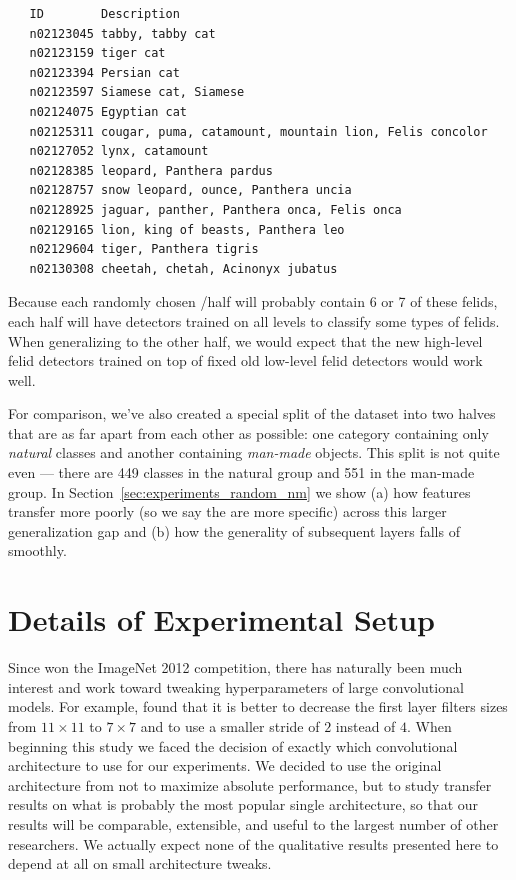 {
\small
\begin{verbatim}
   ID        Description
   n02123045 tabby, tabby cat
   n02123159 tiger cat
   n02123394 Persian cat
   n02123597 Siamese cat, Siamese
   n02124075 Egyptian cat
   n02125311 cougar, puma, catamount, mountain lion, Felis concolor
   n02127052 lynx, catamount
   n02128385 leopard, Panthera pardus
   n02128757 snow leopard, ounce, Panthera uncia
   n02128925 jaguar, panther, Panthera onca, Felis onca
   n02129165 lion, king of beasts, Panthera leo
   n02129604 tiger, Panthera tigris
   n02130308 cheetah, chetah, Acinonyx jubatus
\end{verbatim}
}

Because each randomly chosen \dA/\dB half will probably contain 6 or 7 of these felids, each half will have detectors trained on all levels to classify some types of felids. When generalizing to the other half, we would expect that the new high-level felid detectors trained on top of fixed old low-level felid detectors would work well.

For comparison, we've also created a special split of the dataset into two halves that are as far apart from each other as possible: one category containing only \emph{natural} classes and another containing \emph{man-made} objects. This split is not quite even --- there are 449 classes in the natural group and 551 in the man-made group. In Section~\ref{sec:experiments_random_nm} we show (a) how features transfer more poorly (so we say the are more specific) across this larger generalization gap and (b) how the generality of subsequent layers falls of smoothly.




\section{Details of Experimental Setup}

Since \cite{Krizhevsky-2012} won the ImageNet 2012 competition, there has naturally been much interest and work toward tweaking hyperparameters of large convolutional models. For example, \cite{Zeiler+et+al-arxiv2013b} found that it is better to decrease the first layer filters sizes from $11\times 11$ to $7\times 7$ and to use a smaller stride of $2$ instead of $4$. When beginning this study we faced the decision of exactly which convolutional architecture to use for our experiments. We decided to use the original architecture from \cite{Krizhevsky-2012} not to maximize absolute performance, but to study transfer results on what is probably the most popular single architecture, so that our results will be comparable, extensible, and useful to the largest number of other researchers. We actually expect none of the qualitative results presented here to depend at all on small architecture tweaks.

